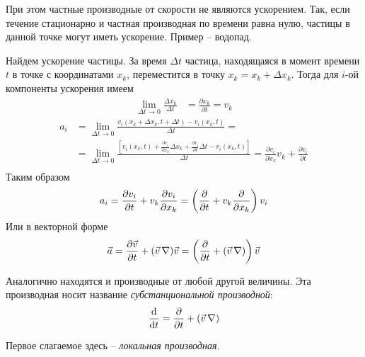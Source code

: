 При этом частные производные от скорости не являются ускорением. Так, если течение стационарно и частная производная по времени  равна нулю, частицы в данной точке могут иметь ускорение. Пример -- водопад.

Найдем ускорение частицы. За время $ \Delta t $ частица, находящаяся в момент времени $t$ в точке с координатами $ x_{k} $, переместится в точку $ x_{k}=x_{k}+\Delta x_{k} $. Тогда для $i$-ой компоненты ускорения имеем
\begin{align*} 
\lim_{\Delta t \rightarrow 0} \frac{\Delta x_{k}}{\Delta t} &=\frac{\partial x_{k}}{\partial t}=v_{k} 
\end{align*}
\begin{align*}
a_{i} &=\lim _{\Delta t \rightarrow 0} \frac{v_{i}\left(x_{k}+\Delta x_{k}, t+\Delta t\right)-v_{i}\left(x_{k}, t\right)}{\Delta t} = \\
&=\lim _{\Delta t \rightarrow 0}\frac{\left[v_{i}\left(x_{k}, t\right)+\frac{\partial v_{i}}{\partial x_{k}} \Delta x_{k}+\frac{\partial v_{i}}{\partial t}\Delta t-v_{i}\left(x_{k}, t\right)\right]}{\Delta t} =\frac{\partial v_{i}}{\partial x_{k}} v_{k}+\frac{\partial v_{i}}{\partial t} \\
\end{align*}
Таким образом 
\begin{align*} 
a_{i} =\frac{\partial v_{i}}{\partial t}+v_{k} \frac{\partial v_{i}}{\partial x_k}=\left(\pdv{t}+v_{k} \pdv{x_k}\right) v_{i}
\end{align*}
Или в векторной форме
\begin{equation}
	\vec{a} =\frac{\partial \vec{v}}{\partial t}+(\vec{v}\,\nabla) \vec{v}=\left(\pdv{t}+(\vec{v}\,\nabla)\right) \vec{v}
\end{equation}

Аналогично находятся и производные от любой другой величины. Эта производная носит название \textit{субстанциональной производной}:
\begin{align*} 
\dv{t}=\pdv{t}+(\vec{v}\,\nabla)
\end{align*}

Первое слагаемое здесь -- \textit{локальная производная}.


